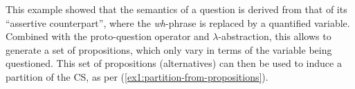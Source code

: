 This example showed that the semantics of a question is derived from that of its ``assertive counterpart'', where the \textit{wh}-phrase is replaced by a quantified variable. Combined with the proto-question operator and $\lambda$-abstraction, this allows to generate a set of propositions, which only vary in terms of the variable being questioned. This set of propositions (alternatives) can then be used to induce a partition of the CS, as per (\ref{ex1:partition-from-propositions}).


%















